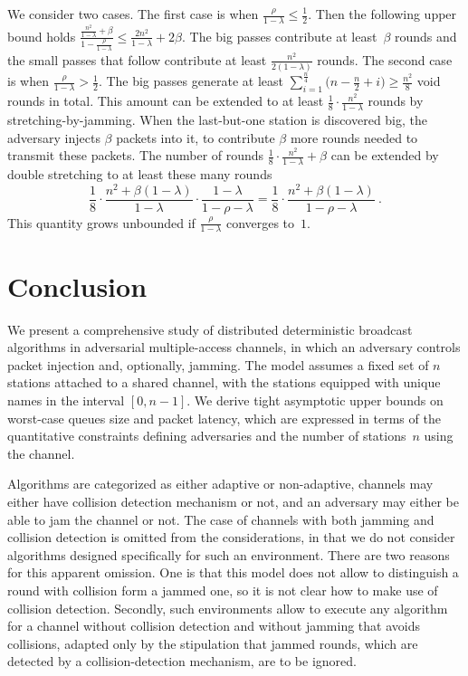 \documentclass[11pt]{article}
\begin{document}
We consider two cases.
The first case is when $\frac{\rho}{1-\lambda}\le \frac{1}{2}$.
Then the following upper bound holds $\frac{\frac{n^2}{1-\lambda} + \beta}{1-\frac{\rho}{1-\lambda}}\le \frac{2n^2}{1-\lambda} + 2\beta $.
The big passes contribute at least~$\beta$ rounds and the small passes that follow contribute at least $\frac{n^2}{2(1-\lambda)}$ rounds.
The second case is when $\frac{\rho}{1-\lambda} > \frac{1}{2}$.
The big passes generate at least $\sum_{i=1}^{\frac{n}{4}} \bigl(n-\frac{n}{2} +i\bigr) \ge \frac{n^2}{8}$ void rounds in total.
This amount can be extended to at least  $\frac{1}{8}\cdot \frac{n^2}{1-\lambda}$ rounds by stretching-by-jamming.
When the last-but-one station is discovered big, the adversary injects $\beta$ packets into it, to contribute $\beta$ more rounds needed to transmit these packets.
The number of rounds $\frac{1}{8}\cdot \frac{n^2}{1-\lambda}+\beta$ can be extended by double stretching to at least these many rounds
\[
\frac{1}{8}\cdot \frac{n^2+\beta(1-\lambda)}{1-\lambda}\cdot \frac{1-\lambda}{1-\rho-\lambda}
=
\frac{1}{8}\cdot \frac{n^2+\beta(1-\lambda)}{1-\rho-\lambda}
\ .
\]
This quantity grows unbounded if $\frac{\rho}{1-\lambda}$ converges to~$1$.


\section{Conclusion}

\label{sec:conclusion}


We present a comprehensive study  of  distributed deterministic broadcast algorithms in adversarial multiple-access channels, in which an adversary controls packet injection and, optionally, jamming.
The model assumes a fixed set of $n$ stations attached to a shared channel, with the stations equipped with unique names in the interval $[0,n-1]$.
We derive tight asymptotic upper bounds on worst-case queues size and packet latency, which are  expressed in terms of the quantitative constraints defining adversaries and the number  of stations~$n$ using the channel. 

Algorithms are categorized as either adaptive or non-adaptive, channels may either have collision detection mechanism or not, and an adversary may either be able to jam the channel or not.
The case of channels with both jamming and collision detection is omitted from the considerations, in that we do not consider algorithms designed specifically for such an environment.
There are two reasons for this apparent omission.
One is that this model does not allow to distinguish a round with collision form a jammed one, so it is not clear how to make use of collision detection.  
Secondly, such  environments allow to execute any algorithm for  a channel without collision detection and without jamming that avoids collisions, adapted only by the stipulation that jammed rounds, which are detected by a collision-detection mechanism, are to be ignored.
\end{document}
